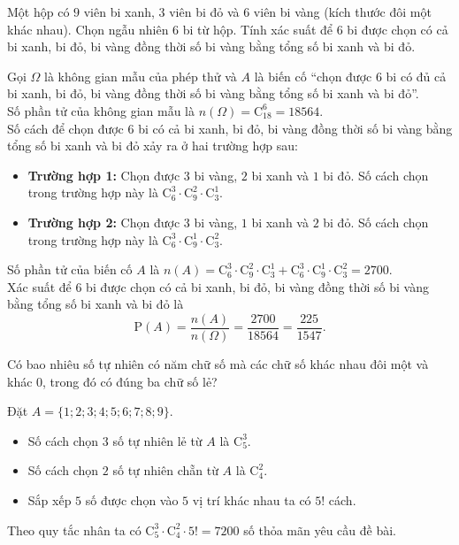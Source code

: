 \begin{bt}%
 Một hộp có $9$ viên bi xanh, $3$ viên bi đỏ và $6$ viên bi vàng (kích thước đôi một khác nhau). Chọn ngẫu nhiên $6$ bi từ hộp. Tính xác suất để $6$ bi được chọn có cả bi xanh, bi đỏ, bi vàng đồng thời số bi vàng bằng tổng số bi xanh và bi đỏ.
 \loigiai
  {
  Gọi $\Omega$ là không gian mẫu của phép thử và $A$ là biến cố ``chọn được $6$ bi có đủ cả bi xanh, bi đỏ, bi vàng đồng thời số bi vàng bằng tổng số bi xanh và bi đỏ''.\\
  Số phần tử của không gian mẫu là $n(\Omega)=\mathrm{C}_{18}^6=18564$.\\
  Số cách để chọn được $6$ bi có cả bi xanh, bi đỏ, bi vàng đồng thời số bi vàng bằng tổng số bi xanh và bi đỏ xảy ra ở hai trường hợp sau:
  \begin{itemize}
   \item \textbf{Trường hợp 1:} Chọn được $3$ bi vàng, $2$ bi xanh và $1$ bi đỏ. Số cách chọn trong trường hợp này là $\mathrm{C}_6^3\cdot\mathrm{C}_9^2\cdot\mathrm{C}_3^1$.
   \item \textbf{Trường hợp 2:} Chọn được $3$ bi vàng, $1$ bi xanh và $2$ bi đỏ. Số cách chọn trong trường hợp này là $\mathrm{C}_6^3\cdot\mathrm{C}_9^1\cdot\mathrm{C}_3^2$.
  \end{itemize}
  Số phần tử của biến cố $A$ là $n(A)=\mathrm{C}_6^3\cdot\mathrm{C}_9^2\cdot\mathrm{C}_3^1 + \mathrm{C}_6^3\cdot\mathrm{C}_9^1\cdot\mathrm{C}_3^2=2700$.\\
  Xác suất để $6$ bi được chọn có cả bi xanh, bi đỏ, bi vàng đồng thời số bi vàng bằng tổng số bi xanh và bi đỏ là
  $$\mathrm{P}(A)=\dfrac{n(A)}{n(\Omega)}=\dfrac{2700}{18564}=\dfrac{225}{1547}.$$
  }
\end{bt}

\begin{bt}%
 Có bao nhiêu số tự nhiên có năm chữ số mà các chữ số khác nhau đôi một và khác $0$, trong đó có đúng ba chữ số lẻ?
 \loigiai
  {
  Đặt $A=\{1;2;3;4;5;6;7;8;9\}$.
  \begin{itemize}
   \item Số cách chọn $3$ số tự nhiên lẻ từ $A$ là $\mathrm{C}_5^3$.
   \item Số cách chọn $2$ số tự nhiên chẵn từ $A$ là $\mathrm{C}_4^2$.
   \item Sắp xếp $5$ số được chọn vào $5$ vị trí khác nhau ta có $5!$ cách.
  \end{itemize}
  Theo quy tắc nhân ta có $\mathrm{C}_5^3\cdot\mathrm{C}_4^2\cdot5!=7200$ số thỏa mãn yêu cầu đề bài.
  }
\end{bt}

